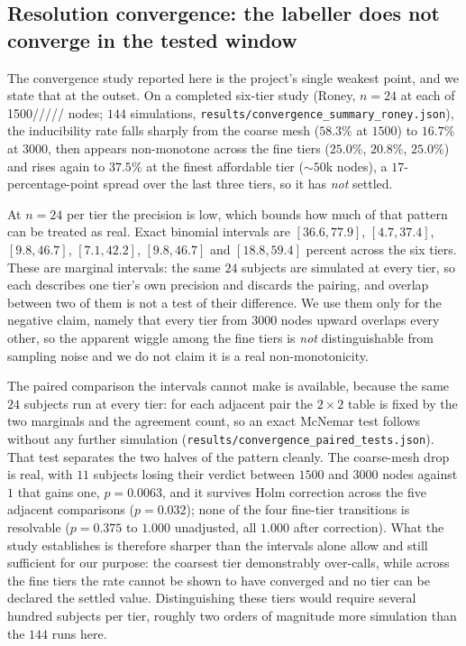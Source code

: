 \documentclass[11pt]{article}
\theoremstyle{definition}
\newcommand{\code}[1]{\texttt{#1}}
\begin{document}
\subsection{Resolution convergence: the labeller does not converge in the tested window}
\label{sec:convergence}
The convergence study reported here is the project's single weakest point, and we
state that at the outset. On a completed six-tier study (Roney, $n=24$ at each of
1500///// nodes; $144$ simulations,
\code{results/\allowbreak convergence\_summary\_roney.json}), the inducibility rate falls
sharply from the coarse mesh ($58.3\%$ at $1500$) to $16.7\%$ at $3000$, then appears
non-monotone across the fine tiers ($25.0\%$, $20.8\%$, $25.0\%$) and rises again
to $37.5\%$ at the finest affordable tier ($\sim\!50$k nodes), a
$17$-percentage-point spread over the last three tiers, so it has \emph{not}
settled.

At $n=24$ per tier the precision is low, which bounds how much of that pattern
can be treated as real. Exact binomial intervals are
$[36.6,77.9]$, $[4.7,37.4]$, $[9.8,46.7]$, $[7.1,42.2]$, $[9.8,46.7]$ and
$[18.8,59.4]$ percent across the six tiers. These are marginal intervals: the
same $24$ subjects are simulated at every tier, so each describes one tier's own
precision and discards the pairing, and overlap between two of them is not a
test of their difference. We use them only for the negative claim, namely that
every tier from $3000$ nodes upward overlaps every other, so the apparent wiggle
among the fine tiers is \emph{not} distinguishable from sampling noise and we do
not claim it is a real non-monotonicity.

The paired comparison the intervals cannot make is available, because the same
$24$ subjects run at every tier: for each adjacent pair the $2\times2$ table is
fixed by the two marginals and the agreement count, so an exact McNemar test
follows without any further simulation
(\code{results/\allowbreak convergence\allowbreak\_paired\allowbreak\_tests.json}).
That test separates the two halves of the pattern cleanly. The coarse-mesh drop
is real, with $11$ subjects losing their verdict between $1500$ and $3000$ nodes
against $1$ that gains one, $p=0.0063$, and it survives Holm correction across
the five adjacent comparisons ($p=0.032$); none of the four fine-tier
transitions is resolvable ($p=0.375$ to $1.000$ unadjusted, all $1.000$ after
correction). What the study establishes is therefore sharper than the intervals
alone allow and still sufficient for our purpose: the coarsest tier demonstrably
over-calls, while across the fine tiers the rate cannot be shown to have
converged and no tier can be declared the settled value. Distinguishing these
tiers would require several hundred subjects per tier, roughly two orders of
magnitude more simulation than the $144$ runs here.
\end{document}
